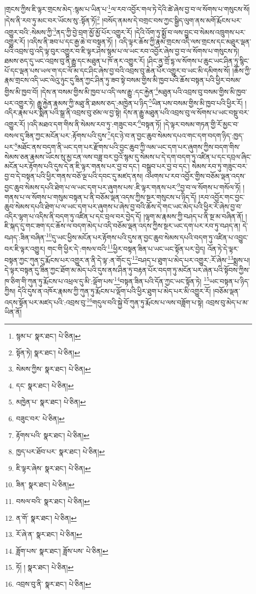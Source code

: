 །གྲངས་ཀྱིས་ཇི་ལྟར་གྲངས་མེད་:སྙམ་པ་ཡིན་པ་\footnote{སྙམ་པ་  སྣར་ཐང་།  པེ་ཅིན། }ལ་རབ་འབྱོར་གལ་ཏེ་དེའི་ཚེ་ཞེས་བྱ་བ་ལ་སོགས་པ་གསུངས་སོ། །དེས་ནི་རབ་ཏུ་མང་བར་ཡོངས་སུ་:སྟོན་ཏོ།\footnote{སྟོན་ཏེ།  སྣར་ཐང་།  པེ་ཅིན། } །བསོད་ནམས་དེ་བགྲང་བས་ཀྱང་སྒྱིད་ལུག་ནས་མགོ་རྨོངས་པར་འགྱུར་བའི་:སེམས་ཀྱི་\footnote{སེམས་ཀྱིས་  སྣར་ཐང་།  པེ་ཅིན། }ནད་ཀྱི་བྱེ་བྲག་མྱོ་མྱོ་པོར་འགྱུར་རོ། །དེའི་འོག་ཏུ་སྨྱོ་བ་ལས་བྱུང་བ་སེམས་འཁྲུགས་པར་འགྱུར་རོ། །འདིས་ནི་ཟབ་པ་དང་རྒྱ་ཆེ་བ་བསྟན་ཏོ། །
འདི་ལྟར་ཆོས་ཀྱི་རྣམ་གྲངས་འདི་ལས་གྲངས་དང་མཐུར་ལྡན་པའི་འབྲས་བུ་འདི་ལྟ་བུར་འགྱུར་བ་ཇི་ལྟར་ཤེས་སྙམ་པ་ལ་ཡང་རབ་འབྱོར་ཞེས་བྱ་བ་ལ་སོགས་པ་གསུངས་ཏེ། ཐམས་ཅད་དུ་ཡང་འབྲས་བུ་ནི་རྒྱུ་དང་མཐུན་པ་ཁོ་ནར་འགྱུར་རོ། །ཤིང་ནྱ་གྲོ་དྷ་ལ་སོགས་པ་ཆུང་ཡང་ཤིན་ཏུ་སྙིང་པོ་དང་ལྡན་པས་ཡལ་ག་དང་ལོ་མ་དང་ཤིང་ཞེས་བྱ་བའི་འབྲས་བུ་ཆེན་པོར་འགྱུར་བ་ཡང་མི་དམིགས་སོ། །ཆོས་ཀྱི་རྣམ་གྲངས་འདི་ཡང་ལེའུ་ཉུང་དུ་ཟིན་ཀྱང་ཤིན་ཏུ་ཟབ་སྟེ་བསམ་གྱིས་མི་ཁྱབ་པའི་ཆོས་བསྟན་པའི་ཕྱིར་བསམ་གྱིས་མི་ཁྱབ་བོ། །དེས་ན་བསམ་གྱིས་མི་ཁྱབ་པ་འདི་ལས་རྒྱུ་:དང་རྐྱེན་\footnote{དང་  སྣར་ཐང་།  པེ་ཅིན། }མཐུན་པའི་འབྲས་བུ་བསམ་གྱིས་མི་ཁྱབ་པར་འགྱུར་ཏེ། རྒྱུ་རྐྱེན་རྣམས་ཀྱི་མཐུ་ནི་ཐམས་ཅད་:མཁྱེན་པ་ཉིད་\footnote{མཁྱེན་པ་  སྣར་ཐང་།  པེ་ཅིན། }ཡིན་པས་བསམ་གྱིས་མི་ཁྱབ་པའི་ཕྱིར་རོ། །འདིར་རྣམ་པར་སྨིན་པའི་སྒྲ་ནི་འབྲས་བུ་ཙམ་ལ་བྱ་སྟེ། དེས་ན་རྒྱུ་མཐུན་པའི་འབྲས་བུ་ལ་སོགས་པ་ཡང་བསྡུ་བར་འགྱུར་རོ། །འདི་མཐའ་དག་གིས་ནི་སེམས་རབ་ཏུ་:གཟུང་བར་\footnote{བཟུང་བར་  པེ་ཅིན། }བསྟན་ཏོ། །དེ་ལྟར་བསམ་གཏན་གྱི་རོ་མྱང་བ་བསལ་དུ་ཟིན་ཀྱང་མངོན་པར་:རྟོགས་པའི་དུས་\footnote{རྟོགས་པའི་  སྣར་ཐང་།  པེ་ཅིན། }དང་ཉེ་བ་ན་བྱང་ཆུབ་སེམས་དཔའ་གང་དག་བདག་ཉིད་:ཁྱད་པར་\footnote{ཁྱད་པར་ཐོབ་པར་  སྣར་ཐང་།  པེ་ཅིན། }མཐོང་ནས་བདག་ནི་ཡང་དག་པར་རྫོགས་པའི་བྱང་ཆུབ་ཀྱི་ལམ་ཡང་དག་པར་ཞུགས་ཀྱིས་བདག་གིས་སེམས་ཅན་རྣམས་ཡོངས་སུ་མྱ་ངན་ལས་བཟླ་བར་བྱའོ་སྙམ་དུ་སེམས་པ་དེ་དག་བདག་ཏུ་འཛིན་པ་དང་དབྲལ་ཞིང་མངོན་པར་རྟོགས་པའི་དུས་དེ་ན་ཇི་ལྟར་གནས་པར་བྱ་བ་དང་། བསྒྲུབ་པར་བྱ་བ་དང་། སེམས་རབ་ཏུ་གཟུང་བར་བྱ་བ་དེ་བསྟན་པའི་ཕྱིར་གནས་བཅོ་ལྔ་པའི་དབང་དུ་མཛད་ནས། འཕགས་པ་རབ་འབྱོར་གྱིས་བཅོམ་ལྡན་འདས་བྱང་ཆུབ་སེམས་དཔའི་ཐེག་པ་ལ་ཡང་དག་པར་ཞུགས་པས་:ཇི་ལྟར་གནས་པར་\footnote{ཇི་ལྟར་ཞེས་  སྣར་ཐང་།  པེ་ཅིན། }བྱ་བ་ལ་སོགས་པ་གསོལ་ཏོ། །གནས་པ་ལ་སོགས་པ་གསུམ་བསྟན་པ་ནི་བཅོམ་ལྡན་འདས་ཀྱིས་སྔར་གསུངས་པ་ཉིད་དོ། །རབ་འབྱོར་གང་བྱང་ཆུབ་སེམས་དཔའི་ཐེག་པ་ལ་ཡང་དག་པར་ཞུགས་པ་ཞེས་བྱ་བའི་ཆོས་དེ་གང་ཡང་མེད་པའི་ཕྱིར་རོ་ཞེས་བྱ་བ་འདིར་ལྷག་པ་འདིས་ནི་བདག་ཏུ་འཛིན་པ་དང་བྲལ་བར་བྱེད་དོ། །ལྷག་མ་རྣམས་ཀྱི་བཤད་པ་ནི་སྔ་མ་བཞིན་ནོ། །ཇི་སྐད་དུ་གང་ཟག་དང་ཆོས་ལ་བདག་མེད་པ་འདི་བཅོམ་ལྡན་འདས་ཀྱིས་སྔར་ཡང་དག་པར་རབ་ཏུ་བཤད་ན། དེ་བཤད་:ཟིན་བཞིན་\footnote{ཟིན་  སྣར་ཐང་།  པེ་ཅིན། }དུ་ཡང་ཕྱིས་མངོན་པར་རྟོགས་པའི་དུས་ན་བྱང་ཆུབ་སེམས་དཔའི་བདག་ཏུ་འཛིན་པ་འབྱུང་བར་ཇི་ལྟར་འགྱུར། གང་གི་ཕྱིར་དེ་:གསལ་བའི་\footnote{བསལ་བའི་  སྣར་ཐང་།  པེ་ཅིན། }ཕྱིར་བསྟན་ཟིན་པ་ཡང་ཡང་སྟོན་པར་བྱེད། འོན་ཏེ་དེ་ལྟར་བསྟན་ཀྱང་ཀུན་དུ་རྨོངས་པར་འགྱུར་ན་ནི་དེ་ལྟ་:ན་གོང་དུ་\footnote{ན་གོ་  སྣར་ཐང་།  པེ་ཅིན། }བཤད་པ་ཐུག་པ་མེད་པར་འགྱུར་:རོ་ཞེས་\footnote{རོ་ཞེ་ན་  སྣར་ཐང་།  པེ་ཅིན། }སྨྲས་པ། དེ་ལྟར་བསྟན་དུ་ཟིན་ཀྱང་ཐོག་མ་མེད་པའི་དུས་ནས་ཤིན་ཏུ་བརྟན་པོར་བདག་ཏུ་མངོན་པར་ཞེན་པའི་སྟོབས་ཀྱིས་ཁ་ཅིག་གི་ཀུན་ཏུ་རྨོངས་པ་འཕྲལ་དུ་མི་:ལྡོག་པས་\footnote{ཟློག་པས་  སྣར་ཐང་། ཟློས་པས་  པེ་ཅིན། }བསྟན་ཟིན་པའི་དོན་ཀྱང་ཡང་སྟོན་ཏེ། \footnote{ཏོ། །   སྣར་ཐང་།  པེ་ཅིན། }ཡང་བསྟན་པ་ཉིད་ཀྱིས། དེའི་དུས་ན་འཁོར་རྣམས་ཀྱི་ཀུན་ཏུ་རྨོངས་པ་ལྡོག་པའི་ཕྱིར་ཐུག་པ་མེད་པར་མི་འགྱུར་རོ། །བཅོམ་ལྡན་འདས་སྟོན་པར་མཛད་པའི་:འབྲས་བུ་\footnote{འབྲས་བུ་ནི་  སྣར་ཐང་།  པེ་ཅིན། }གདུལ་བའི་སྐྱེ་བོ་ཀུན་ཏུ་རྨོངས་པ་ལས་བཟློག་པ་སྟེ། འབྲས་བུ་མེད་པ་མ་ཡིན་ནོ། 